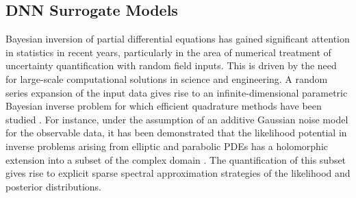 \documentclass[final]{siamart171218}
\newcommand{\bhtodo}[1]{\todo[linecolor=red,backgroundcolor=red!25,bordercolor=red]{#1}}
\newcommand{\W}{\mathcal{W}}
\begin{document}

\subsection{DNN Surrogate Models}\label{sec:surrogate-models}
Bayesian inversion of partial differential equations has gained significant attention in statistics in recent years, particularly in the area of numerical treatment of uncertainty quantification with random field inputs. This is driven by the need for large-scale computational solutions in science and engineering.
A random series expansion of the input data gives rise to an infinite-dimensional parametric Bayesian inverse problem for which efficient quadrature methods have been studied \cite{schwab-sparse}. For instance, under the assumption of an additive Gaussian noise model for the observable data, it has been demonstrated that the likelihood potential in inverse problems arising from elliptic and parabolic PDEs has a holomorphic extension 
into a subset of the complex domain \cite{schillings2013sparse, schillings2014sparsity}. The quantification of this subset gives rise to explicit sparse spectral approximation strategies of the likelihood and posterior distributions.
\end{document}
